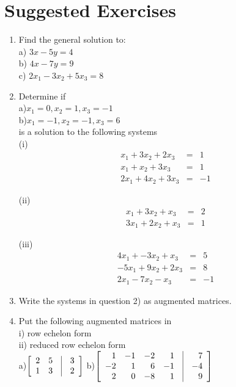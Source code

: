 \section{Suggested Exercises}
\label{ssec.sugexercises}
\begin{enumerate}
\item  Find the general solution to:\\
a) $3x-5y=4$\\
b) $4x-7y=9$\\
c) $2x_1-3x_2+5x_3=8$

\item Determine if\\ a)$x_1=0,x_2=1,x_3=-1$\\  b)$x_1=-1,x_2=-1,x_3=6$\\ is a solution to the following
systems\\
(i)
$$\begin{array}{rrr}
x_1+3x_2+2x_3&=&1\\
x_1+x_2+3x_3&=&1\\
2x_1+4x_2+3x_3&=&-1
\end{array}$$

(ii)
$$\begin{array}{rrr}
x_1+3x_2+x_3&=&2\\
3x_1+2x_2+x_3&=&1
\end{array}$$

(iii)
$$\begin{array}{rrr}
4x_1+-3x_2+x_3&=&5\\
-5x_1+9x_2+2x_3&=&8\\
2x_1-7x_2-x_3&=&-1
\end{array}$$

\item Write the systems in question 2) as augmented matrices.

\item Put the following augmented matrices  in\\
i) row echelon form\\
ii) reduced row echelon form\\
a)$\left [\begin {array}{rrrr} 2&5&\vline&3\\1&3&\vline&2\end {array}
\right ]$
b)$\left [\begin {array}{rrrrrr} 1&-1&-2&1&\vline&7\\-2&1&6&-1
&\vline&-4\\2&0&-8&1&\vline&9\end {array}\right ]$


\end{enumerate}
